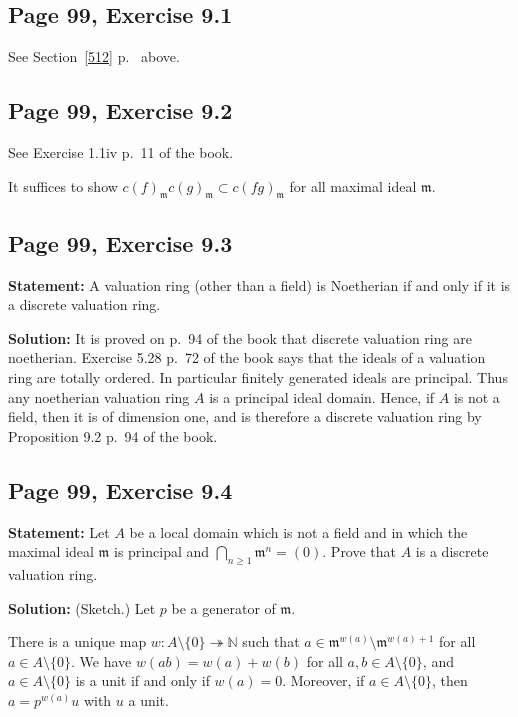 \documentclass[parskip=half,fontsize=12pt]{scrartcl}%
\newcommand{\mf}{\mathfrak}
\newcommand{\mmm}{\mf m}
\newcommand{\epi}{\twoheadrightarrow}
\begin{document}
\subsection{Page 99, Exercise 9.1}%

See Section~\ref{512} p.~\pageref{512} above.

\subsection{Page 99, Exercise 9.2}%

See Exercise 1.1iv p.~11 of the book. 

It suffices to show $c(f)_\mmm c(g)_\mmm\subset c(fg)_\mmm$ for all maximal ideal $\mmm$. 

\subsection{Page 99, Exercise 9.3}%

\textbf{Statement:} A valuation ring (other than a field) is Noetherian if and only if it is a discrete valuation ring.

\textbf{Solution:} It is proved on p.~94 of the book that discrete valuation ring are noetherian. Exercise 5.28 p.~72 of the book says that the ideals of a valuation ring are totally ordered. In particular finitely generated ideals are principal. Thus any noetherian valuation ring $A$ is a principal ideal domain. Hence, if $A$ is not a field, then it is of dimension one, and is therefore a discrete valuation ring by Proposition 9.2 p.~94 of the book.

\subsection{Page 99, Exercise 9.4}%

\textbf{Statement:} Let $A$ be a local domain which is not a field and in which the maximal ideal $\mmm$ is principal and $\bigcap_{n\ge1}\mmm^n=(0)$. Prove that $A$ is a discrete valuation ring.

\textbf{Solution:} (Sketch.) Let $p$ be a generator of $\mmm$. 

There is a unique map $w:A\setminus\{0\}\epi\mathbb N$ such that $a\in\mmm^{w(a)}\setminus\mmm^{w(a)+1}$ for all $a\in A\setminus\{0\}$. We have $w(ab)=w(a)+w(b)$ for all $a,b\in A\setminus\{0\}$, and $a\in A\setminus\{0\}$ is a unit if and only if $w(a)=0$. Moreover, if $a\in A\setminus\{0\}$, then $a=p^{w(a)}u$ with  $u$ a unit.
\end{document}
